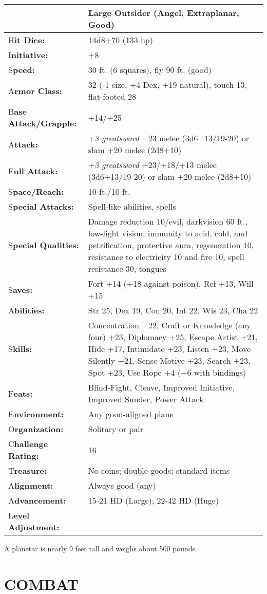 \documentclass{article}
\begin{document}
\begin{tabular}{|>{\raggedright}p{91pt}|>{\raggedright}p{231pt}|}
\hline
  & Large Outsider (Angel, Extraplanar, Good)\tabularnewline
\hline
H\textbf{it Dice:} & 14d8+70 (133 hp)\tabularnewline
\hline
I\textbf{nitiative:} & +8\tabularnewline
\hline
S\textbf{peed:} & 30 ft. (6 squares), fly 90 ft. (good)\tabularnewline
\hline
A\textbf{rmor Class:} & 32 (-1 size, +4 Dex, +19 natural), touch 13, flat-footed 
28\tabularnewline
\hline
B\textbf{ase Attack/Grapple:} & +14/+25\tabularnewline
\hline
A\textbf{ttack:} & +\textit{3 greatsword }+23 melee (3d6+13/19-20) or slam +20 
melee (2d8+10)\tabularnewline
\hline
F\textbf{ull Attack:} & +\textit{3 greatsword }+23/+18/+13 melee (3d6+13/19-20) 
or slam +20 melee (2d8+10)\tabularnewline
\hline
S\textbf{pace/Reach:} & 10 ft./10 ft.\tabularnewline
\hline
S\textbf{pecial Attacks:} & Spell-like abilities, spells\tabularnewline
\hline
S\textbf{pecial Qualities:} & Damage reduction 10/evil, darkvision 60 ft., low-light 
vision, immunity to acid, cold, and petrification, protective aura, regeneration 
10, resistance to electricity 10 and fire 10, spell resistance 30, tongues\tabularnewline
\hline
S\textbf{aves:} & Fort +14 (+18 against poison), Ref +13, Will +15\tabularnewline
\hline
A\textbf{bilities:} & Str 25, Dex 19, Con 20, Int 22, Wis 23, Cha 22\tabularnewline
\hline
S\textbf{kills:} & Concentration +22, Craft or Knowledge (any four) +23, Diplomacy 
+25, Escape Artist +21, Hide +17, Intimidate +23, Listen +23, Move Silently +21, 
Sense Motive +23, Search +23, Spot +23, Use Rope +4 (+6 with bindings)\tabularnewline
\hline
F\textbf{eats:} & Blind-Fight, Cleave, Improved Initiative, Improved Sunder, Power 
Attack\tabularnewline
\hline
E\textbf{nvironment:} & Any good-aligned plane\tabularnewline
\hline
O\textbf{rganization:} & Solitary or pair\tabularnewline
\hline
C\textbf{hallenge Rating:} & 16\tabularnewline
\hline
T\textbf{reasure:} & No coins; double goods; standard items\tabularnewline
\hline
A\textbf{lignment:} & Always good (any)\tabularnewline
\hline
A\textbf{dvancement:} & 15-21 HD (Large); 22-42 HD (Huge)\tabularnewline
\hline
L\textbf{evel Adjustment:}--- & \tabularnewline
\hline
\end{tabular}

A planetar is nearly 9 feet tall and weighs about 500 pounds.

\section*{COMBAT}
\end{document}
